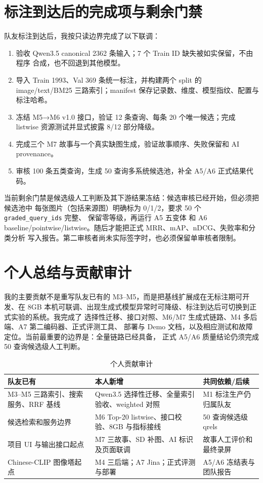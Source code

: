 \documentclass[UTF8,11pt,a4paper]{ctexart}
\begin{document}
\section{标注到达后的完成项与剩余门禁}

队友标注到达后，我按只读边界完成了以下联调：

\begin{enumerate}
  \item 验收 Qwen3.5 canonical 2362 条输入；7 个 Train ID 缺失被如实保留，不由程序
  合成，也不回退到其他模型。
  \item 导入 Train 1993、Val 369 条统一标注，并构建两个 split 的 image/text/BM25
  三路索引；manifest 保存记录数、维度、模型指纹、配置与标注哈希。
  \item 冻结 M5→M6 v1.0 接口，验证 12 条查询、每条 20 个唯一候选；完成 listwise
  资源测试并显式披露 8/12 部分降级。
  \item 完成三个 M7 故事与一个真实缺图生成，验证故事顺序、失败保留和 AI provenance。
  \item 审核 100 条五类查询，生成 50 查询多系统候选池，补全 A5/A6 正式结果代码。
\end{enumerate}

当前剩余门禁是候选级人工判断及其下游结果冻结：候选审核已经开始，但必须把候选池中
每张图片（包括来源图）明确标为 0/1/2，要求 50 个 \texttt{graded\_query\_ids} 完整、
保留零等级，再运行 A5 五变体
和 A6 baseline/pointwise/listwise。随后才能把正式 MRR、mAP、nDCG、失败率和分类分析
写入报告。第二审核者尚未实际签字时，也必须保留单审核者限制。

\section{个人总结与贡献审计}

我的主要贡献不是重写队友已有的 M3--M5，而是把基线扩展成在无标注期可开发、在 8GB
本机可联调、出现生成式模型异常时可降级、标注到达后可切换到正式实验的系统。我完成了
选择性迁移、接口对照、M6/M7 生成式链路、M4 多后端、A7 第二编码器、正式评测工具、
部署与 Demo 文档，以及相应测试和故障定位。当前最重要的边界是：全量链路已经具备，
正式 A5/A6 质量结论仍须完成 50 查询候选级人工判断。

\begin{table}[htbp]
\centering
\small
\caption{个人贡献审计}
\begin{tabularx}{\textwidth}{YYY}
\toprule
队友已有 & 本人新增 & 共同依赖/后续 \\
\midrule
M3--M5 三路索引、搜索服务、RRF 基线 & Qwen3.5 选择性迁移、全量索引验收、weighted 对照 & M1 标注生产仍归属队友 \\
候选检索和服务边界 & M6 Top-20 listwise、接口校验、8GB 与指标接线 & 50 查询候选级 qrels \\
项目 UI 与输出接口起点 & M7 三故事、SD 补图、AI 标识及页面联调 & 故事人工评价和最终录屏 \\
Chinese-CLIP 图像塔起点 & M4 三后端；A7 Jina；正式评测与部署 & A5/A6 冻结表与团队报告 \\
\bottomrule
\end{tabularx}
\end{table}
\end{document}
